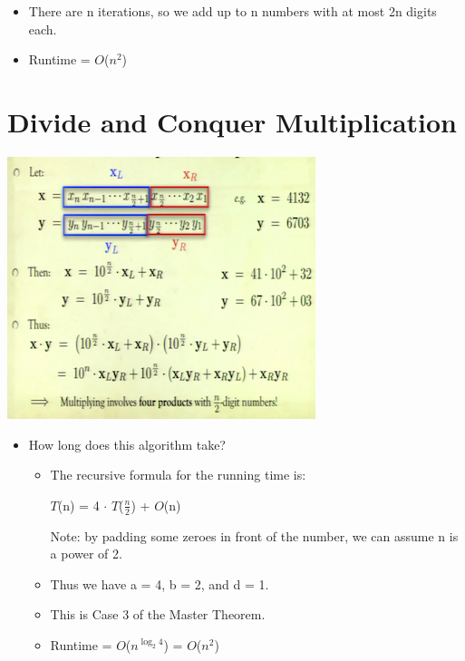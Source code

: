 \documentclass[12pt]{article}
\begin{document}
\begin{itemize}
\begin{itemize}
		\begin{itemize}
		\item There are n iterations, so we add up to n numbers with at most 2n digits each.
		\item Runtime = $O$($n^2$)
		\end{itemize}
	\end{itemize}
\end{itemize}

\section{Divide and Conquer Multiplication}
\renewcommand{\labelitemii}{$\circ$}
\renewcommand{\labelitemiii}{$\cdot$}
\renewcommand{\labelitemiii}{$\rightarrow$}
\includegraphics{lecture43}
\begin{itemize}
\item How long does this algorithm take?
	\begin{itemize}
	\item The recursive formula for the running time is:
	
	\hspace*{\fill} $T$(n) = 4 $\cdot$ $T$($\frac{n}{2}$) + $O$(n)\hspace*{\fill} 
	
	Note: by padding some zeroes in front of the number, we can assume n is a power of 2.
	\item Thus we have a = 4, b = 2, and d = 1.
	\item This is Case 3 of the Master Theorem.
	\item Runtime = $O$($n^{\log_2 4}$) = $O$($n^2$)
	\end{itemize}
\end{itemize}
\end{document}
